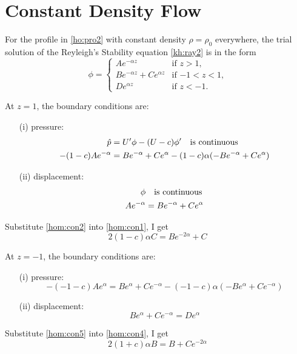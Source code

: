 \section{Constant Density Flow}
For the profile in \eqref{ho:pro2} with constant density
$\rho=\rho_0$ everywhere, the trial solution of the Reyleigh's
Stability equation \eqref{kh:ray2} is in the form
\begin{equation}\label{hom:con0}
\phi =
\begin{cases}
Ae^{-\alpha z} &\text{if $z>1$,}\\
Be^{-\alpha z} + Ce^{\alpha z} &\text{if $-1<z<1$,}\\
De^{\alpha z} &\text{if $z<-1$.}
\end{cases}
\end{equation}

At $z=1$, the boundary conditions are:
\begin{enumerate}
  \item[(i)] pressure:
  \begin{align}
    \hat{p}&=U'\phi-(U-c)\phi'\quad \text{is continuous}\notag\\
    -(1-c)Ae^{-\alpha}&=Be^{-\alpha} + Ce^{\alpha}-(1-c)\alpha(-B
    e^{-\alpha}+Ce^{\alpha})\label{hom:con1}
  \end{align}
  \item[(ii)] displacement:
  \begin{align}
    \phi &\quad \text{is continuous}\notag\\
    Ae^{-\alpha}&=Be^{-\alpha} + Ce^{\alpha}\label{hom:con2}
  \end{align}
\end{enumerate}
Substitute \eqref{hom:con2} into \eqref{hom:con1}, I get
\begin{equation}\label{hom:con3}
    2(1-c)\alpha C=Be^{-2\alpha}+C
\end{equation}

At $z=-1$, the boundary conditions are:
\begin{enumerate}
  \item[(i)] pressure:
  \begin{equation}
    -(-1-c)Ae^{\alpha}=Be^{\alpha} + Ce^{-\alpha}-(-1-c)\alpha(-B
    e^{\alpha}+Ce^{-\alpha})\label{hom:con4}
  \end{equation}
  \item[(ii)] displacement:
  \begin{equation}
    Be^{\alpha} + Ce^{-\alpha}=De^{\alpha}\label{hom:con5}
  \end{equation}
\end{enumerate}
Substitute \eqref{hom:con5} into \eqref{hom:con4}, I get
\begin{equation}\label{hom:con6}
    2(1+c)\alpha B=B+Ce^{-2\alpha}
\end{equation}

